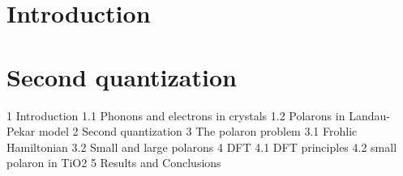 


    
\frontmatter


\tableofcontents




\mainmatter
\chapter{Introduction}


\chapter{Second quantization}





1 Introduction
    1.1 Phonons and electrons in crystals
    1.2 Polarons in Landau-Pekar model
2 Second quantization
3 The polaron problem
   3.1 Frohlic Hamiltonian
   3.2 Small and large polarons
4 DFT
   4.1 DFT principles
   4.2 small polaron in TiO2
5 Results and Conclusions